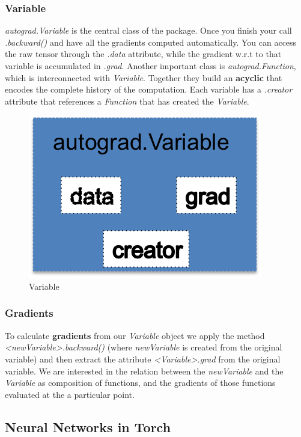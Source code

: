 \documentclass[]{report}
\begin{document}
\subsubsection{Variable}

\textit{autograd.Variable} is the central class of the package. Once you finish your call \textit{.backward()} and have all the gradients computed automatically. You can access the raw tensor through the \textit{.data} attribute, while the gradient w.r.t to that variable is accumulated in \textit{.grad}. 
Another important class is \textit{autograd.Function}, which is interconnected with \textit{Variable}. Together they build an \textbf{acyclic} that encodes the complete history of the computation. Each variable has a \textit{.creator} attribute that references a \textit{Function} that has created the \textit{Variable}.  
\begin{figure}[!]
\centering
\includegraphics{../Pytorch_learning/autograd}\caption{Variable}
\end{figure}

\subsubsection{Gradients}

To calculate \textbf{gradients} from our \textit{Variable} object we apply the method \textit{<newVariable>.backward()} (where \textit{newVariable} is created from the original variable) and then extract the attribute \textit{<Variable>.grad} from the original variable. We are interested in the relation between the \textit{newVariable} and the \textit{Variable} as composition of functions, and the gradients of those functions evaluated at the a particular point. 


\subsection{Neural Networks in Torch}
\end{document}
